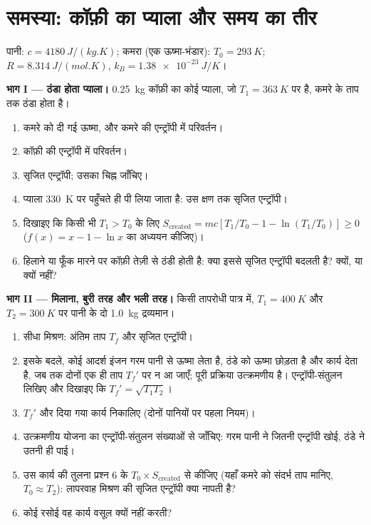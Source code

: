 \section{समस्या: कॉफ़ी का प्याला और समय का तीर}

\begin{problem}[{सप्ताहांत समस्या --- ठंडा होता एक प्याला, मिलाया गया एक
जल-कुंड, एक प्रशीतक और अणुओं का एक डिब्बा: चार एन्ट्रॉपी-संतुलन, और सृजित
एन्ट्रॉपी कार्य के रूप में कितनी क़ीमत की थी}]
\label{pb:b1:second-law-entropy:1}
पानी: $c = \qty{4180}{J/(kg.K)}$; कमरा (एक ऊष्मा-भंडार): $T_0 = \qty{293}{K}$;
$R = \qty{8.314}{J/(mol.K)}$, $k_B = \qty{1.38e-23}{J/K}$।

\medskip
\noindent\textbf{भाग I --- ठंडा होता प्याला।}
\qty{0.25}{kg} कॉफ़ी का कोई प्याला, जो $T_1 = \qty{363}{K}$ पर है, कमरे के
ताप तक ठंडा होता है।
\begin{enumerate}
  \item कमरे को दी गई ऊष्मा, और कमरे की एन्ट्रॉपी में परिवर्तन।
  \item कॉफ़ी की एन्ट्रॉपी में परिवर्तन।
  \item सृजित एन्ट्रॉपी; उसका चिह्न जाँचिए।
  \item प्याला \qty{330}{K} पर पहुँचते ही पी लिया जाता है: उस क्षण तक
        सृजित एन्ट्रॉपी।
  \item दिखाइए कि किसी भी $T_1 > T_0$ के लिए $S_{\mathrm{created}} = mc[T_1/T_0 - 1 -
        \ln(T_1/T_0)] \geq 0$ ($f(x) = x - 1 - \ln x$ का अध्ययन कीजिए)।
  \item हिलाने या फूँक मारने पर कॉफ़ी तेज़ी से ठंडी होती है: क्या इससे
        सृजित एन्ट्रॉपी बदलती है? क्यों, या क्यों नहीं?
\end{enumerate}

\medskip
\noindent\textbf{भाग II --- मिलाना, बुरी तरह और भली तरह।}
किसी तापरोधी पात्र में, $T_1 = \qty{400}{K}$ और $T_2 =
\qty{300}{K}$ पर पानी के दो \qty{1.0}{kg} द्रव्यमान।
\begin{enumerate}[resume]
  \item सीधा मिश्रण: अंतिम ताप $T_f$ और सृजित एन्ट्रॉपी।
  \item इसके बदले, कोई आदर्श इंजन गरम पानी से ऊष्मा लेता है, ठंडे को
        ऊष्मा छोड़ता है और कार्य देता है, जब तक दोनों एक ही ताप
        $T_f'$ पर न आ जाएँ; पूरी प्रक्रिया उत्क्रमणीय है।
        एन्ट्रॉपी-संतुलन लिखिए और दिखाइए कि $T_f' = \sqrt{T_1T_2}$।
  \item $T_f'$ और दिया गया कार्य निकालिए (दोनों पानियों पर पहला नियम)।
  \item उत्क्रमणीय योजना का एन्ट्रॉपी-संतुलन संख्याओं से जाँचिए: गरम पानी
        ने जितनी एन्ट्रॉपी खोई, ठंडे ने उतनी ही पाई।
  \item उस कार्य की तुलना प्रश्न 6 के $T_0 \times S_{\mathrm{created}}$ से
        कीजिए (यहाँ कमरे को संदर्भ ताप मानिए, $T_0 \approx T_2$):
        लापरवाह मिश्रण की सृजित एन्ट्रॉपी क्या नापती है?
  \item कोई रसोई वह कार्य वसूल क्यों नहीं करती?
\end{enumerate}


\end{problem}
